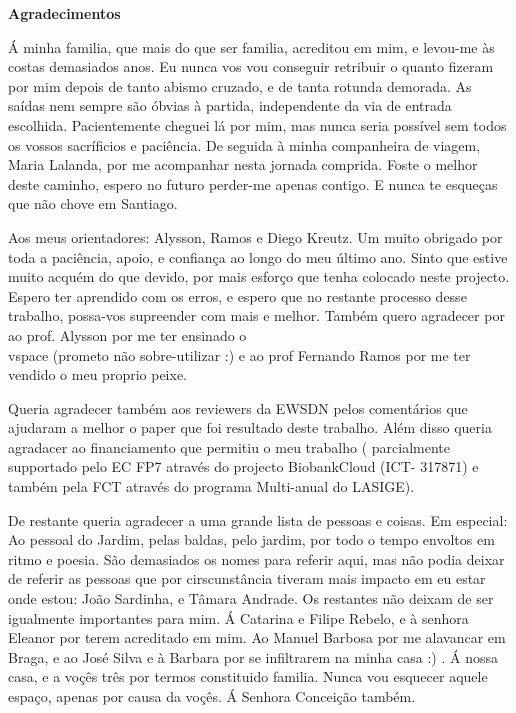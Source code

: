 \pagestyle{plain}

\vspace*{2cm}
\begin{center}
\Large \bf Agradecimentos
\end{center}
\vspace*{1cm} \setlength{\baselineskip}{0.6cm}

 Á minha familia, que mais do que ser familia, acreditou em mim, e levou-me às costas demasiados anos. Eu nunca vos vou conseguir retribuir o quanto fizeram por mim depois de tanto abismo cruzado, e de tanta rotunda demorada. As saídas nem sempre são óbvias à partida, independente da via de entrada escolhida. Pacientemente cheguei lá por  mim, mas nunca seria possível sem todos os vossos sacríficios e paciência. De seguida à minha  companheira de viagem, Maria Lalanda, por me acompanhar nesta jornada comprida. Foste o melhor deste caminho, espero no futuro perder-me apenas contigo. E nunca te esqueças que não chove em Santiago. 

Aos meus orientadores: Alysson,  Ramos e Diego Kreutz. Um muito obrigado por toda a paciência, apoio, e confiança ao longo do meu último ano. Sinto que estive muito acquém do que devido, por mais esforço que tenha colocado neste projecto. Espero ter aprendido com os erros, e espero que no restante processo desse trabalho, possa-vos supreender com mais e melhor. Também quero agradecer por ao prof. Alysson por me ter ensinado o \\vspace (prometo não sobre-utilizar :) e ao prof Fernando Ramos por me ter vendido o meu proprio peixe. 


Queria agradecer também aos reviewers da EWSDN pelos comentários que ajudaram a melhor o paper que foi resultado deste trabalho. Além disso queria agradacer ao financiamento que permitiu o meu trabalho ( parcialmente supportado pelo EC FP7 através do projecto BiobankCloud (ICT- 317871) e também pela FCT através do programa Multi-anual do LASIGE). 

De restante queria agradecer a uma grande lista de pessoas e coisas. Em especial: 
Ao pessoal do Jardim, pelas baldas, pelo jardim, por todo o tempo envoltos em ritmo e poesia. São demasiados os nomes para referir aqui, mas não podia deixar de referir as pessoas que por cirscunstância tiveram mais impacto em eu estar onde estou: João Sardinha, e Tâmara Andrade. Os restantes não deixam de ser igualmente importantes para mim. Á Catarina e Filipe Rebelo, e à senhora Eleanor por terem acreditado em mim.  Ao Manuel Barbosa por me alavancar em Braga, e ao  José Silva e à Barbara por se infiltrarem na minha casa :) .   Á nossa casa, e a voçês três por termos constituido familia. Nunca vou esquecer aquele espaço, apenas por causa da voçês. Á Senhora Conceição também. 


